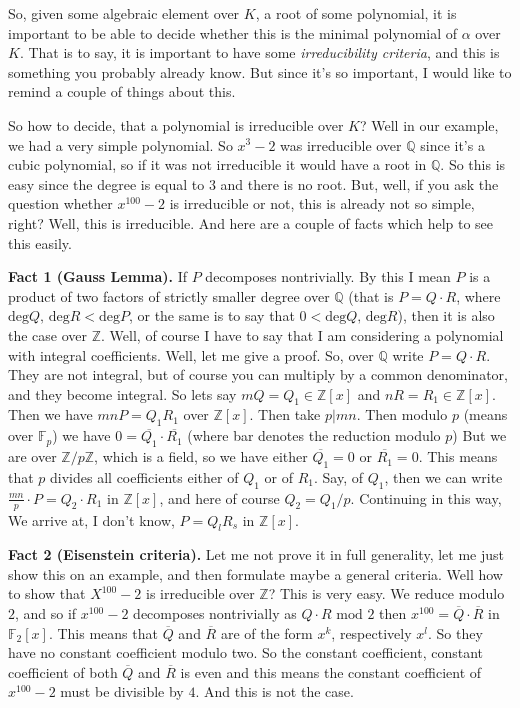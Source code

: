So, given some algebraic element over $K$, a root of some polynomial, it is important to be able to decide whether this is the minimal polynomial of $\alpha$ over $K$. That is to say, it is important to have some \textit{irreducibility criteria}, and this is something you probably already know. But since it's so important, I would like to remind a couple of things about this.

So how to decide, that a polynomial is irreducible over $K$? Well in our example, we had a very simple polynomial. So $x^3-2$ was irreducible over $\mathbb{Q}$ since it's a cubic polynomial, so if it was not irreducible it would have a root in $\mathbb{Q}$. So this is easy since the degree is equal to $3$ and there is no root. But, well, if you ask the question whether $x^{100}-2$ is irreducible or not, this is already not so simple, right? Well, this is irreducible. And here are a couple of facts which help to see this easily. 

\textbf{Fact 1 (Gauss Lemma).}  If $P$ decomposes nontrivially. By this I mean $P$ is a product of two factors of strictly smaller degree over $\mathbb{Q}$ (that is $P = Q \cdot R$, where $\text{deg}Q\text{, }\text{deg}R<\text{deg}P$, or the same is to say that $0<\text{deg}Q\text{, }\text{deg}R$), then it is also the case over $\mathbb{Z}$. Well, of course I have to say that I am considering a polynomial with integral coefficients. Well, let me give a proof. So, over $\mathbb{Q}$ write $P =Q \cdot R$. They are not integral, but of course you can multiply by a common denominator, and they become integral. So lets say $mQ=Q_1\in \mathbb{Z}[x]$ and $nR=R_1\in \mathbb{Z}[x]$. Then we have $mnP=Q_1 R_1$ over $\mathbb{Z}[x]$. Then take $p|mn$. Then modulo $p$ (means over $\mathbb{F}_p$) we have $0 = \overbar{Q_1} \cdot \overbar{R_1}$ (where bar denotes the reduction modulo $p$) But we are over $\mathbb{Z}/p\mathbb{Z}$, which is a field, so we have either $\overbar{Q_1}=0$ or $\overbar{R_1}=0$. This means that $p$ divides all coefficients either of $Q_1$ or of $R_1$. Say, of $Q_1$, then we can write $\frac{mn}{p}\cdot P=Q_2\cdot R_1$ in $\mathbb{Z}[x]$, and here of course $Q_2 = Q_1 / p$. Continuing in this way, We arrive at, I don't know, $P=Q_l R_s$ in $\mathbb{Z}[x]$. 

\textbf{Fact 2 (Eisenstein criteria).} Let me not prove it in full generality, let me just show this on an example, and then formulate maybe a general criteria. Well how to show that $X^{100}-2$ is irreducible over $\mathbb{Z}$? This is very easy. We reduce modulo $2$, and so if $x^{100} - 2$ decomposes nontrivially as $Q \cdot R\text{ mod }2$ then $x^{100}=\overbar{Q}\cdot\overbar{R}$ in  $\mathbb{F}_2[x]$. This means that $\overbar{Q}$ and $\overbar{R}$ are of the form $x^k$, respectively $x^l$. So they have no constant coefficient modulo two. So the constant coefficient, constant coefficient of both $\overbar{Q}$ and $\overbar{R}$ is even and this means the constant coefficient of $x^{100} - 2$ must be divisible by $4$. And this is not the case.

